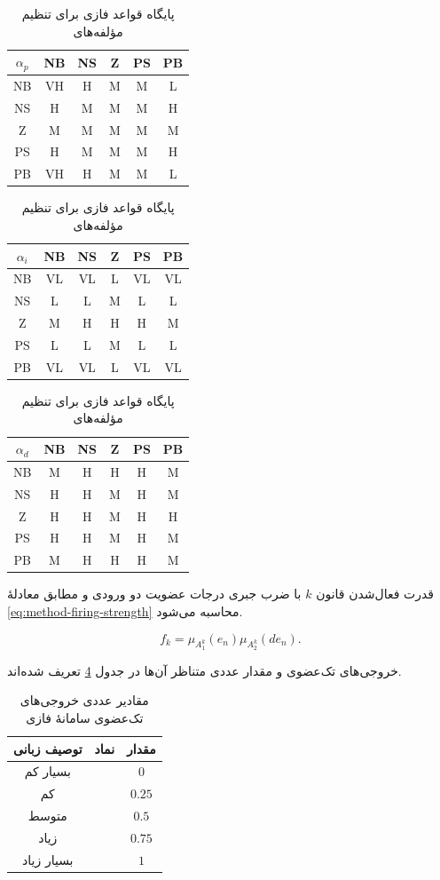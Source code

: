 \begin{table}[!htbp]
	\centering
	\small
	\caption{پایگاه قواعد فازی برای تنظیم مؤلفه‌های }
	\label{tab:method-fuzzy-rules}
	\begin{tabular}{|c|ccccc|}
		\hline $\alpha_p$ & NB&NS&Z&PS&PB\\ \hline
		NB&VH&H&M&M&L\\ NS&H&M&M&M&H\\ Z&M&M&M&M&M\\ PS&H&M&M&M&H\\ PB&VH&H&M&M&L\\ \hline
	\end{tabular}
	\vspace{2mm}

	\begin{tabular}{|c|ccccc|}
		\hline $\alpha_i$ & NB&NS&Z&PS&PB\\ \hline
		NB&VL&VL&L&VL&VL\\ NS&L&L&M&L&L\\ Z&M&H&H&H&M\\ PS&L&L&M&L&L\\ PB&VL&VL&L&VL&VL\\ \hline
	\end{tabular}
	\vspace{2mm}

	\begin{tabular}{|c|ccccc|}
		\hline $\alpha_d$ & NB&NS&Z&PS&PB\\ \hline
		NB&M&H&H&H&M\\ NS&H&H&M&H&M\\ Z&H&H&M&H&H\\ PS&H&H&M&H&M\\ PB&M&H&H&H&M\\ \hline
	\end{tabular}
\end{table}

قدرت فعال‌شدن قانون $k$ با ضرب جبری درجات عضویت دو ورودی و مطابق معادلهٔ \ref{eq:method-firing-strength} محاسبه می‌شود.

\begin{equation}
	f_k=\mu_{A_1^k}(e_n)\mu_{A_2^k}(de_n).
	\label{eq:method-firing-strength}
\end{equation}

خروجی‌های تک‌عضوی و مقدار عددی متناظر آن‌ها در جدول \ref{tab:method-output-mfs} تعریف شده‌اند.

\begin{table}[!htbp]
	\centering
	\caption{مقادیر عددی خروجی‌های تک‌عضوی سامانهٔ فازی}
	\label{tab:method-output-mfs}
	\begin{tabular}{|c|c|c|}
		\hline
		\textbf{توصیف زبانی} & \textbf{نماد} & \textbf{مقدار}\\ \hline
		بسیار کم & \lr{VL} & $0$\\ \hline
		کم & \lr{L} & $0.25$\\ \hline
		متوسط & \lr{M} & $0.5$\\ \hline
		زیاد & \lr{H} & $0.75$\\ \hline
		بسیار زیاد & \lr{VH} & $1$\\ \hline
	\end{tabular}
\end{table}

